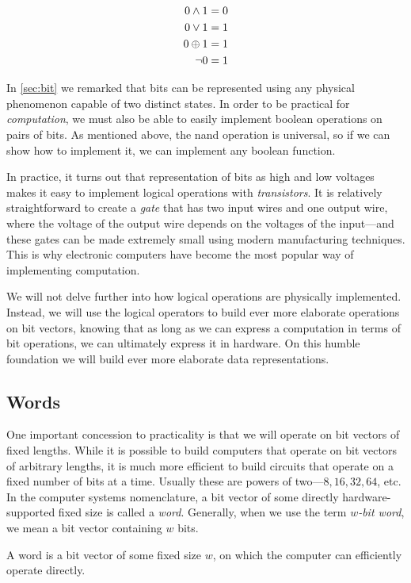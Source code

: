 \begin{align}
  0 \land 1 &= 0 \\
  0 \lor 1 &= 1 \\
  0 \oplus 1 &= 1 \\
  \neg 0 &= 1
\end{align}

In \cref{sec:bit} we remarked that bits can be represented using any
physical phenomenon capable of two distinct states.  In order to be
practical for \emph{computation}, we must also be able to easily
implement boolean operations on pairs of bits.  As mentioned above,
the nand operation is universal, so if we can show how to implement
it, we can implement any boolean function.

In practice, it turns out that representation of bits as high and low
voltages makes it easy to implement logical operations with
\emph{transistors}.  It is relatively straightforward to create a
\emph{gate} that has two input wires and one output wire, where the
voltage of the output wire depends on the voltages of the input---and
these gates can be made extremely small using modern manufacturing
techniques.  This is why electronic computers have become the most
popular way of implementing computation.

We will not delve further into how logical operations are physically
implemented.  Instead, we will use the logical operators to build ever
more elaborate operations on bit vectors, knowing that as long as we
can express a computation in terms of bit operations, we can
ultimately express it in hardware.  On this humble foundation we will
build ever more elaborate data representations.

\subsection{Words}
\label{sec:words}

One important concession to practicality is that we will operate on
bit vectors of fixed lengths.  While it is possible to build computers
that operate on bit vectors of arbitrary lengths, it is much more
efficient to build circuits that operate on a fixed number of bits at
a time.  Usually these are powers of two---$8,16,32,64$, etc.  In the
computer systems nomenclature, a bit vector of some directly
hardware-supported fixed size is called a \emph{word}.  Generally,
when we use the term \emph{$w$-bit word}, we mean a bit vector
containing $w$ bits.

\begin{definition}[Word]
  A word is a bit vector of some fixed size $w$, on which the computer
  can efficiently operate directly.
\end{definition}

